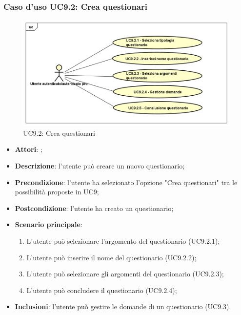 	\subsubsection{Caso d'uso UC9.2: Crea questionari}
	\label{UC9.2}
	\begin{figure}[h]
		\centering
	\includegraphics[scale=0.5,keepaspectratio]{UML/UC9_2.png}
		\caption{UC9.2: Crea questionari}
	\end{figure}
	\FloatBarrier
	\begin{itemize}
		\item \textbf{Attori}: \uaupro;
		\item \textbf{Descrizione}: l'utente può creare un nuovo questionario; 
		\item \textbf{Precondizione}: l'utente ha selezionato l'opzione "Crea questionari" tra le possibilità proposte in UC9;
		\item \textbf{Postcondizione}: l'utente ha creato un questionario;
		\item \textbf{Scenario principale}:
			\begin{enumerate}
				\item L'utente può selezionare l'argomento del questionario (UC9.2.1);
				\item L'utente può inserire il nome del questionario (UC9.2.2);
				\item L'utente può selezionare gli argomenti del questionario (UC9.2.3);
				\item L'utente può concludere il questionario (UC9.2.4);
			\end{enumerate}
		\item \textbf{Inclusioni}: l'utente può gestire le domande di un questionario (UC9.3).		
		\end{itemize}
	
